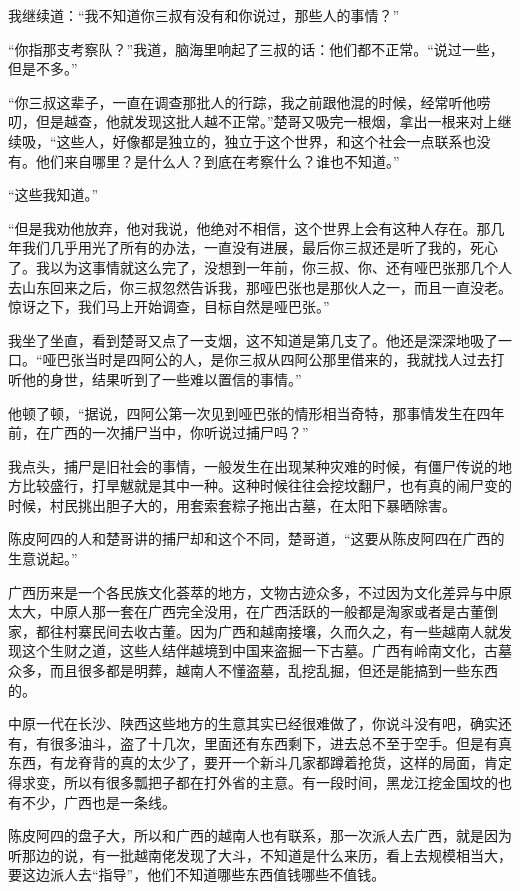 我继续道：“我不知道你三叔有没有和你说过，那些人的事情？”

“你指那支考察队？”我道，脑海里响起了三叔的话：他们都不正常。“说过一些，但是不多。”

“你三叔这辈子，一直在调查那批人的行踪，我之前跟他混的时候，经常听他唠叨，但是越查，他就发现这批人越不正常。”楚哥又吸完一根烟，拿出一根来对上继续吸，“这些人，好像都是独立的，独立于这个世界，和这个社会一点联系也没有。他们来自哪里？是什么人？到底在考察什么？谁也不知道。”

“这些我知道。”

“但是我劝他放弃，他对我说，他绝对不相信，这个世界上会有这种人存在。那几年我们几乎用光了所有的办法，一直没有进展，最后你三叔还是听了我的，死心了。我以为这事情就这么完了，没想到一年前，你三叔、你、还有哑巴张那几个人去山东回来之后，你三叔忽然告诉我，那哑巴张也是那伙人之一，而且一直没老。惊讶之下，我们马上开始调查，目标自然是哑巴张。”

我坐了坐直，看到楚哥又点了一支烟，这不知道是第几支了。他还是深深地吸了一口。“哑巴张当时是四阿公的人，是你三叔从四阿公那里借来的，我就找人过去打听他的身世，结果听到了一些难以置信的事情。”

他顿了顿，“据说，四阿公第一次见到哑巴张的情形相当奇特，那事情发生在四年前，在广西的一次捕尸当中，你听说过捕尸吗？”

我点头，捕尸是旧社会的事情，一般发生在出现某种灾难的时候，有僵尸传说的地方比较盛行，打旱魃就是其中一种。这种时候往往会挖坟翻尸，也有真的闹尸变的时候，村民挑出胆子大的，用套索套粽子拖出古墓，在太阳下暴晒除害。

陈皮阿四的人和楚哥讲的捕尸却和这个不同，楚哥道，“这要从陈皮阿四在广西的生意说起。”

广西历来是一个各民族文化荟萃的地方，文物古迹众多，不过因为文化差异与中原太大，中原人那一套在广西完全没用，在广西活跃的一般都是淘家或者是古董倒家，都往村寨民间去收古董。因为广西和越南接壤，久而久之，有一些越南人就发现这个生财之道，这些人结伴越境到中国来盗掘一下古墓。广西有岭南文化，古墓众多，而且很多都是明葬，越南人不懂盗墓，乱挖乱掘，但还是能搞到一些东西的。

中原一代在长沙、陕西这些地方的生意其实已经很难做了，你说斗没有吧，确实还有，有很多油斗，盗了十几次，里面还有东西剩下，进去总不至于空手。但是有真东西，有龙脊背的真的太少了，要开一个新斗几家都蹲着抢货，这样的局面，肯定得求变，所以有很多瓢把子都在打外省的主意。有一段时间，黑龙江挖金国坟的也有不少，广西也是一条线。

陈皮阿四的盘子大，所以和广西的越南人也有联系，那一次派人去广西，就是因为听那边的说，有一批越南佬发现了大斗，不知道是什么来历，看上去规模相当大，要这边派人去“指导”，他们不知道哪些东西值钱哪些不值钱。

